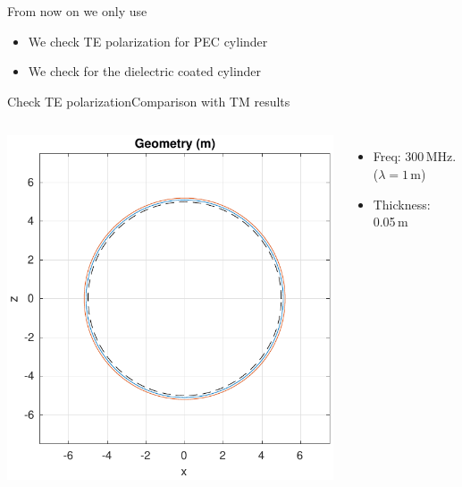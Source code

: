 
  \begin{frame}[plain]
    From now on we only use {\GreenD}
    \begin{itemize}
    \item We check TE polarization for PEC cylinder
    \item We check for the dielectric coated  cylinder 
    \end{itemize}
  \end{frame}
  
  
  \begin{frame}[allowframebreaks]{Check TE polarization}{Comparison
      with TM results}
    
    \begin{columns}
      \includegraphics[width=\linewidth]{results/TE/geometry.pdf}
      
      \begin{itemize}
      \item
        Freq: 300\,MHz. ($\lambda=1\,$m)
      \item
        Thickness: 0.05\,m
      \end{itemize}
      

\end{columns}
\end{frame}
